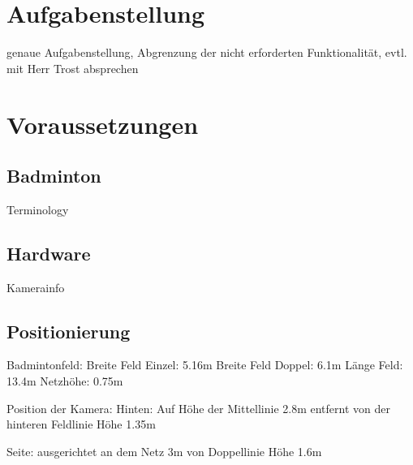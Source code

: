 \section{Aufgabenstellung}
genaue Aufgabenstellung, Abgrenzung der nicht erforderten Funktionalität, evtl. mit Herr Trost absprechen
\section{Voraussetzungen}
\subsection{Badminton}
Terminology	
\subsection{Hardware}
Kamerainfo
\subsection{Positionierung}
Badmintonfeld: 
Breite Feld Einzel: 5.16m
Breite Feld Doppel: 6.1m
Länge Feld: 13.4m
Netzhöhe: 0.75m

Position der Kamera:
Hinten:
Auf Höhe der Mittellinie
2.8m entfernt von der hinteren Feldlinie
Höhe 1.35m

Seite:
ausgerichtet an dem Netz
3m von Doppellinie
Höhe 1.6m